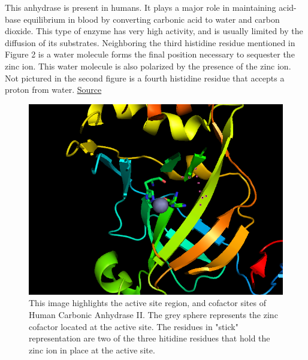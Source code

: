 \documentclass[11pt]{article}
\begin{document}
This anhydrase is present in humans. It plays a major role in maintaining acid-base
equilibrium in blood by converting carbonic acid to water and carbon dioxide. This 
type of enzyme has very high activity, and is usually limited by the diffusion of its
substrates. Neighboring the third histidine residue mentioned in Figure 2 is
a water molecule forms the final position necessary to sequester the zinc ion.
This water molecule is also polarized by the presence of the zinc ion. 
Not pictured in the second figure is a fourth histidine residue that
accepts a proton from water. \href{http://en.wikipedia.org/wiki/Carbonic_anhydrase}{Source}


\begin{figure}
  \centering 

\includegraphics[scale=0.5]{1MOO_active.png}

\caption{This image highlights the active site region, and cofactor sites of Human
Carbonic Anhydrase II. The grey sphere represents the zinc cofactor located at the
active site. The residues in "stick" representation are two of the three hitidine residues
that hold the zinc ion in place at the active site.
}
\end{figure}
\end{document}
